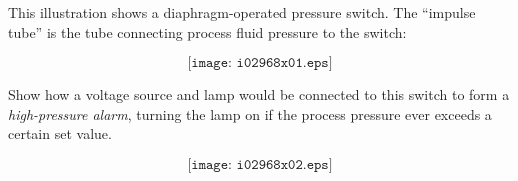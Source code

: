 

This illustration shows a diaphragm-operated pressure switch.  The ``impulse tube'' is the tube connecting process fluid pressure to the switch:

\vskip 50pt

$$\texttt{[image: i02968x01.eps]}$$

Show how a voltage source and lamp would be connected to this switch to form a {\it high-pressure alarm}, turning the lamp on if the process pressure ever exceeds a certain set value.







$$\texttt{[image: i02968x02.eps]}$$










